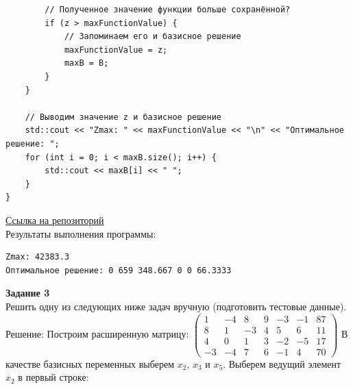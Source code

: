 \documentclass[a4paper,14pt]{extarticle}
\begin{document}
\begin{verbatim}
        // Полученное значение функции больше сохранённой?
        if (z > maxFunctionValue) {
            // Запоминаем его и базисное решение
            maxFunctionValue = z;
            maxB = B;
        }
    }

    // Выводим значение z и базисное решение
    std::cout << "Zmax: " << maxFunctionValue << "\n" << "Оптимальное решение: ";
    for (int i = 0; i < maxB.size(); i++) {
        std::cout << maxB[i] << " ";
    }
}
    \end{verbatim}
\href{https://github.com/IAmProgrammist/operations_research/blob/master/src/lab1/task2/main.cpp}{Ссылка на репозиторий}\\

Результаты выполнения программы:
\begin{verbatim}
Zmax: 42383.3
Оптимальное решение: 0 659 348.667 0 0 66.3333 
\end{verbatim}

\textbf{Задание 3}\\
Решить одну из следующих ниже задач вручную (подготовить тестовые данные).\bigbreak
Решение:
Построим расширенную матрицу:\bigbreak
$\begin{pmatrix}
        1  & -4 & 8  & 9 & -3 & -1 & 87 \\
        8  & 1  & -3 & 4 & 5  & 6  & 11 \\
        4  & 0  & 1  & 3 & -2 & -5 & 17 \\
        -3 & -4 & 7  & 6 & -1 & 4  & 70
    \end{pmatrix}$\bigbreak
В качестве базисных переменных выберем $x_2$, $x_3$ и $x_5$. Выберем ведущий элемент $x_2$ в первый строке:\bigbreak
\end{document}
